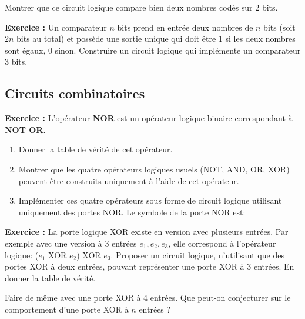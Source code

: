 \documentclass{article}
\newcounter{exo}
\newcommand{\exercice}{
\stepcounter{exo}
\noindent\textbf{Exercice \theexo :}
}
\begin{document}
Montrer que ce circuit logique compare bien deux nombres codés sur 2 bits.

\exercice Un comparateur $n$ bits prend en entrée deux nombres de $n$ bits (soit $2n$ bits au total) et possède une sortie unique qui doit être 1 si les deux nombres sont égaux, 0 sinon. Construire un circuit logique qui implémente un comparateur 3 bits.

\subsection{Circuits combinatoires}




\exercice L'opérateur \textbf{NOR} est un opérateur logique binaire correspondant à \textbf{NOT OR}.
\begin{enumerate}
	\item Donner la table de vérité de cet opérateur.
	\item Montrer que les quatre opérateurs logiques usuels (NOT, AND, OR, XOR) peuvent être construits uniquement à l'aide de cet opérateur.
	\item Implémenter ces quatre opérateurs sous forme de circuit logique utilisant uniquement des portes NOR. Le symbole de la porte NOR est: 
\end{enumerate}

\exercice La porte logique XOR existe en version avec plusieurs entrées. Par exemple avec une version à 3 entrées $e_1, e_2, e_3$, elle correspond à l'opérateur logique: ($e_1$ XOR $e_2$) XOR $e_3$. Proposer un circuit logique, n'utilisant que des portes XOR à deux entrées, pouvant représenter une porte XOR à 3 entrées. En donner la table de vérité.

Faire de même avec une porte XOR à 4 entrées. Que peut-on conjecturer sur le comportement d'une porte XOR à $n$ entrées ?
\end{document}
